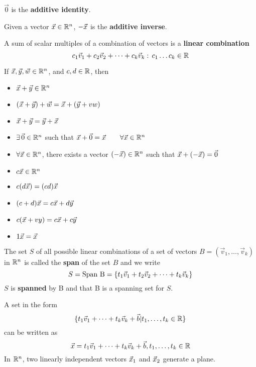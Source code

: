 \documentclass[english, 12pt]{article}
\begin{document}
\begin{defn}
$\vec{0}$ is the \textbf{additive identity}.
\end{defn}

\begin{defn}
Given a vector $\vec{x} \in {\mathbb{R}}^n$, $-\vec{x}$ is the \textbf{additive inverse}.
\end{defn}

\begin{defn}
A sum of scalar multiples of a combination of vectors is a \textbf{linear combination}
\[c_{1} \vec{v}_{1} + c_{2} \vec{v}_{2} + \cdots + c_{k} \vec{v}_{k}:\,c_{1}\dots c_{k} \in {\mathbb{R}}\]
\end{defn}

\begin{thrm}
If $\vec{x},\vec{y},\vec{w} \in {\mathbb{R}}^n$, and $c,d \in {\mathbb{R}}$, then
\begin{itemize}
\item $\vec{x} + \vec{y} \in {\mathbb{R}}^n$
\item $(\vec{x} + \vec{y}) + \vec{w} = \vec{x} + (\vec{y} + vw)$
\item $\vec{x} + \vec{y} = \vec{y} + \vec{x}$
\item $\exists\, \vec{0} \in {\mathbb{R}}^n$ such that $\vec{x} + \vec{0} = \vec{x}\qquad\forall \vec{x} \in {\mathbb{R}}^n$
\item $\forall \vec{x} \in {\mathbb{R}}^n$, there exists a vector $(- \vec{x}) \in {\mathbb{R}}^n$ such that $\vec{x} + (- \vec{x}) = \vec{0}$
\item $c \vec{x} \in {\mathbb{R}}^n$
\item $c (d \vec{x}) = (cd) \vec{x}$
\item $(c+d) \vec{x} = c \vec{x} + d \vec{y}$
\item $c (\vec{x} + vy) = c \vec{x} + c \vec{y}$
\item $1 \vec{x} = \vec{x}$
\end{itemize}
\end{thrm}

\begin{defn}
The set $S$ of all possible linear combinations of a set of vectors $B = (\vec{v}_{1} , \dots , \vec{v}_{k})$ in ${\mathbb{R}}^n$ is called the \textbf{span} of the set $B$ and we write
\[S = \text{Span B} =\{t_{1} \vec{v}_{1} + t_{2} \vec{v}_{2} + \cdots + t_{k}\vec{v}_{k}\}\]
$S$ is \textbf{spanned} by B and that B is a spanning set for $S$.
\end{defn}

\begin{note}
A set in the form
\[  \{t_{1} \vec{v}_{1} + \dots + t_{k} \vec{v}_{k} + \vec{b} | t_{1},\dots,t_{k} \in {\mathbb{R}} \}\]
can be written as
\[  \vec{x} = t_{1} \vec{v}_{1} + \dots + t_{k} \vec{v}_{k} + \vec{b} , t_{1},\dots,t_{k} \in {\mathbb{R}}\]
In ${\mathbb{R}}^n$, two linearly independent vectors $\vec{x}_{1}$ and $\vec{x}_{2}$ generate a plane.
\end{note}
\end{document}
